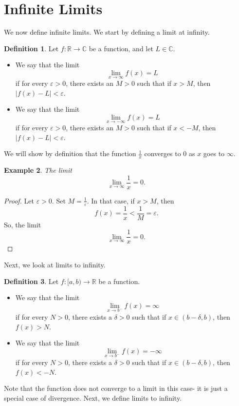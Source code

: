 \documentclass[a4paper, openany]{memoir}
\theoremstyle{definition}
\newtheorem{definition}{Definition}[section]
\theoremstyle{plain}
\newtheorem{example}[definition]{Example}
\begin{document}
\newpage

\section{Infinite Limits}
We now define infinite limits. We start by defining a limit at infinity.
\begin{definition}
Let $f: \mathbb{R} \to \mathbb{C}$ be a function, and let $L \in \mathbb{C}$. 
\begin{itemize}
    \item We say that the limit
    \[\lim_{x \to \infty} f(x) = L\]
    if for every $\varepsilon > 0$, there exists an $M > 0$ such that if $x > M$, then $|f(x) - L| < \varepsilon$.
    
    \item We say that the limit
    \[\lim_{x \to -\infty} f(x) = L\]
    if for every $\varepsilon > 0$, there exists an $M > 0$ such that if $x < -M$, then $|f(x) - L| < \varepsilon$.
\end{itemize}
\end{definition}
\noindent We will show by definition that the function $\frac{1}{x}$ converges to 0 as $x$ goes to $\infty$.
\begin{example}
The limit
\[\lim_{x \to \infty} \frac{1}{x} = 0.\]
\end{example}
\begin{proof}
Let $\varepsilon > 0$. Set $M = \frac{1}{\varepsilon}$. In that case, if $x > M$, then
\[f(x) = \frac{1}{x} < \frac{1}{M} = \varepsilon.\]
So, the limit
\[\lim_{x \to \infty} \frac{1}{x} = 0.\]
\end{proof}
Next, we look at limits to infinity.
\begin{definition}
Let $f: [a, b) \to \mathbb{R}$ be a function. 
\begin{itemize}
    \item We say that the limit
    \[\lim_{x \to b^-} f(x) = \infty\]
    if for every $N > 0$, there exists a $\delta > 0$ such that if $x \in (b - \delta, b)$, then $f(x) > N$.
    
    \item We say that the limit
    \[\lim_{x \to b^-} f(x) = -\infty\]
    if for every $N > 0$, there exists a $\delta > 0$ such that if $x \in (b - \delta, b)$, then $f(x) < -N$.
\end{itemize}
\end{definition}
\noindent Note that the function does not converge to a limit in this case- it is just a special case of divergence. Next, we define limits to infinity.
\end{document}
